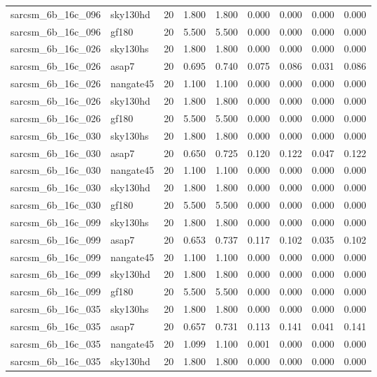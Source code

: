 \begin{tabular}{llrrrrrrr}
sarcsm\_6b\_16c\_096 & sky130hd & 20 & 1.800 & 1.800 & 0.000 & 0.000 & 0.000 & 0.000 \\
sarcsm\_6b\_16c\_096 & gf180 & 20 & 5.500 & 5.500 & 0.000 & 0.000 & 0.000 & 0.000 \\
sarcsm\_6b\_16c\_026 & sky130hs & 20 & 1.800 & 1.800 & 0.000 & 0.000 & 0.000 & 0.000 \\
sarcsm\_6b\_16c\_026 & asap7 & 20 & 0.695 & 0.740 & 0.075 & 0.086 & 0.031 & 0.086 \\
sarcsm\_6b\_16c\_026 & nangate45 & 20 & 1.100 & 1.100 & 0.000 & 0.000 & 0.000 & 0.000 \\
sarcsm\_6b\_16c\_026 & sky130hd & 20 & 1.800 & 1.800 & 0.000 & 0.000 & 0.000 & 0.000 \\
sarcsm\_6b\_16c\_026 & gf180 & 20 & 5.500 & 5.500 & 0.000 & 0.000 & 0.000 & 0.000 \\
sarcsm\_6b\_16c\_030 & sky130hs & 20 & 1.800 & 1.800 & 0.000 & 0.000 & 0.000 & 0.000 \\
sarcsm\_6b\_16c\_030 & asap7 & 20 & 0.650 & 0.725 & 0.120 & 0.122 & 0.047 & 0.122 \\
sarcsm\_6b\_16c\_030 & nangate45 & 20 & 1.100 & 1.100 & 0.000 & 0.000 & 0.000 & 0.000 \\
sarcsm\_6b\_16c\_030 & sky130hd & 20 & 1.800 & 1.800 & 0.000 & 0.000 & 0.000 & 0.000 \\
sarcsm\_6b\_16c\_030 & gf180 & 20 & 5.500 & 5.500 & 0.000 & 0.000 & 0.000 & 0.000 \\
sarcsm\_6b\_16c\_099 & sky130hs & 20 & 1.800 & 1.800 & 0.000 & 0.000 & 0.000 & 0.000 \\
sarcsm\_6b\_16c\_099 & asap7 & 20 & 0.653 & 0.737 & 0.117 & 0.102 & 0.035 & 0.102 \\
sarcsm\_6b\_16c\_099 & nangate45 & 20 & 1.100 & 1.100 & 0.000 & 0.000 & 0.000 & 0.000 \\
sarcsm\_6b\_16c\_099 & sky130hd & 20 & 1.800 & 1.800 & 0.000 & 0.000 & 0.000 & 0.000 \\
sarcsm\_6b\_16c\_099 & gf180 & 20 & 5.500 & 5.500 & 0.000 & 0.000 & 0.000 & 0.000 \\
sarcsm\_6b\_16c\_035 & sky130hs & 20 & 1.800 & 1.800 & 0.000 & 0.000 & 0.000 & 0.000 \\
sarcsm\_6b\_16c\_035 & asap7 & 20 & 0.657 & 0.731 & 0.113 & 0.141 & 0.041 & 0.141 \\
sarcsm\_6b\_16c\_035 & nangate45 & 20 & 1.099 & 1.100 & 0.001 & 0.000 & 0.000 & 0.000 \\
sarcsm\_6b\_16c\_035 & sky130hd & 20 & 1.800 & 1.800 & 0.000 & 0.000 & 0.000 & 0.000 \\

\end{tabular}
